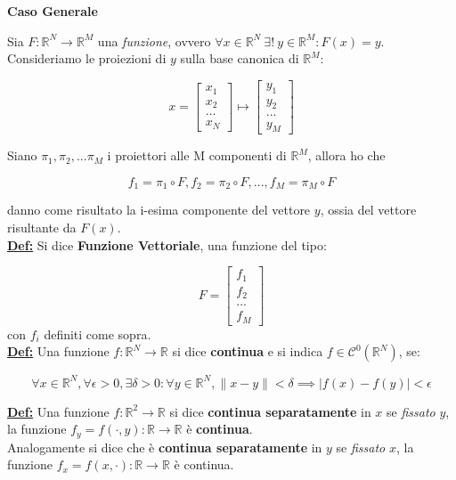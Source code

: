 \documentclass[a4paper,12pt]{article}
\newcommand{\definizione}{\noindent\textbf{\underline{Def:}} }
\begin{document}
	\noindent \textbf{Caso Generale}

	\noindent Sia $F : \mathbb{R}^N \rightarrow \mathbb{R}^M$ una \textit{funzione}, ovvero $\forall x \in \mathbb{R}^N \ \exists! \ y \in \mathbb{R}^M : F(x) = y$. Consideriamo le proiezioni di $y$ sulla base canonica di $\mathbb{R}^M$:

	\[
	x = \begin{bmatrix}
		x_1 \\ x_2 \\ ... \\ x_N
	\end{bmatrix} \mapsto
	\begin{bmatrix}
		y_1 \\ y_2 \\ ... \\ y_M
	\end{bmatrix}
	\]

	\noindent Siano $\pi_1, \pi_2, ... \pi_M$ i proiettori alle M componenti di $\mathbb{R}^M$, allora ho che

	\[
	f_1 = \pi_1 \circ F, f_2 = \pi_2 \circ F, ..., f_M = \pi_M \circ F
	\]

	danno come risultato la i-esima componente del vettore $y$, ossia del vettore risultante da $F(x)$. \\

	\definizione Si dice \textbf{Funzione Vettoriale}, una funzione del tipo:

	\[
	F = \begin{bmatrix}
		f_1 \\ f_2 \\ ... \\ f_M
	\end{bmatrix}
	\]
	con $f_i$ definiti come sopra. \\

	\definizione Una funzione $f : \mathbb{R}^N \rightarrow \mathbb{R}$ si dice \textbf{continua} e si indica $f \in \mathcal{C}^0(\mathbb{R}^N)$, se:

	\[
	\forall x \in \mathbb{R}^N, \forall \epsilon > 0, \exists \delta > 0 : \forall y \in \mathbb{R}^N, \| x - y\| < \delta \implies |f(x) - f(y) | < \epsilon
	\]

	\definizione Una funzione $f : \mathbb{R}^2 \rightarrow \mathbb{R}$ si dice \textbf{continua separatamente} in $x$ se \textit{fissato} $y$, la funzione $f_y = f(\cdot, y) : \mathbb{R} \rightarrow \mathbb{R}$ è \textbf{continua}.\\
	Analogamente si dice che è \textbf{continua separatamente} in $y$ se \textit{fissato} $x$, la funzione $f_x = f(x, \cdot) : \mathbb{R} \rightarrow \mathbb{R}$ è continua.
\end{document}
